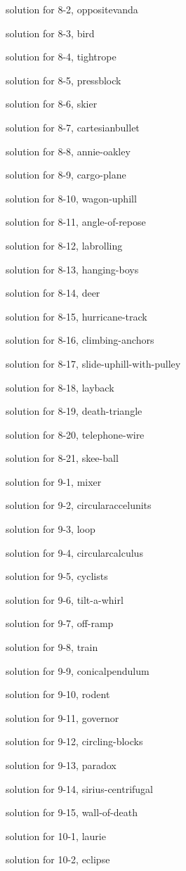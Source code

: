 \documentclass{problems}
\begin{document}
solution for 8-2, oppositevanda

solution for 8-3, bird

solution for 8-4, tightrope

solution for 8-5, pressblock

solution for 8-6, skier

solution for 8-7, cartesianbullet

solution for 8-8, annie-oakley

solution for 8-9, cargo-plane

solution for 8-10, wagon-uphill

solution for 8-11, angle-of-repose

solution for 8-12, labrolling

solution for 8-13, hanging-boys

solution for 8-14, deer

solution for 8-15, hurricane-track

solution for 8-16, climbing-anchors

solution for 8-17, slide-uphill-with-pulley

solution for 8-18, layback

solution for 8-19, death-triangle

solution for 8-20, telephone-wire

solution for 8-21, skee-ball

solution for 9-1, mixer

solution for 9-2, circularaccelunits

solution for 9-3, loop

solution for 9-4, circularcalculus

solution for 9-5, cyclists

solution for 9-6, tilt-a-whirl

solution for 9-7, off-ramp

solution for 9-8, train

solution for 9-9, conicalpendulum

solution for 9-10, rodent

solution for 9-11, governor

solution for 9-12, circling-blocks

solution for 9-13, paradox

solution for 9-14, sirius-centrifugal

solution for 9-15, wall-of-death

solution for 10-1, laurie

solution for 10-2, eclipse
\end{document}

